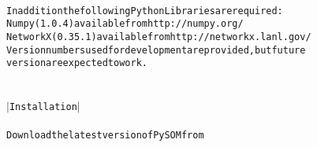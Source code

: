 {{\begin{tabbing}
\\
{\texttt{In\hspace{6pt}addition\hspace{6pt}the\hspace{6pt}following\hspace{6pt}Python\hspace{6pt}Libraries\hspace{6pt}are\hspace{6pt}required:}}\\
{\texttt{Numpy\hspace{6pt}(1.0.4)\hspace{6pt}available\hspace{6pt}from\hspace{6pt}http://numpy.org/}}\\
{\texttt{NetworkX\hspace{6pt}(0.35.1)\hspace{6pt}available\hspace{6pt}from\hspace{6pt}http://networkx.lanl.gov/}}\\
{\texttt{Version\hspace{6pt}numbers\hspace{6pt}used\hspace{6pt}for\hspace{6pt}development\hspace{6pt}are\hspace{6pt}provided,\hspace{6pt}but\hspace{6pt}future}}\\
{\texttt{version\hspace{6pt}are\hspace{6pt}expected\hspace{6pt}to\hspace{6pt}work.}}\\
\\
{\texttt{\dash{}\dash{}\dash{}\dash{}\dash{}\dash{}\dash{}\dash{}\dash{}\dash{}\dash{}\dash{}\dash{}\dash{}\dash{}\dash{}}}\\
{\texttt{$|$\hspace{6pt}Installation\hspace{6pt}$|$}}\\
{\texttt{\dash{}\dash{}\dash{}\dash{}\dash{}\dash{}\dash{}\dash{}\dash{}\dash{}\dash{}\dash{}\dash{}\dash{}\dash{}\dash{}}}\\
{\texttt{Download\hspace{6pt}the\hspace{6pt}latest\hspace{6pt}version\hspace{6pt}of\hspace{6pt}PySOM\hspace{6pt}from}}\\

\end{tabbing}}}
